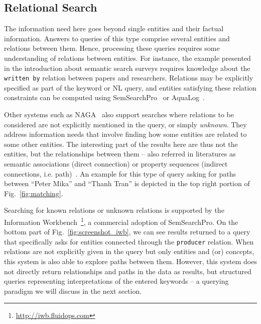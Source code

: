 \subsection{Relational Search} The information need here goes beyond single entities and their factual information. Answers to queries of this type comprise several entities and relations between them. Hence, processing these queries requires some understanding of relations between entities. For instance, the example presented in the introduction about semantic search surveys requires knowledge about the \verb+written by+ relation between papers and researchers. Relations may be explicitly specified as part of the keyword or NL query, and entities satisfying these relation constraints can be computed using SemSearchPro~\cite{DBLP:journals/ws/TranHL11} or AquaLog~\cite{DBLP:journals/ws/LopezUMP07}. 

Other systems such as NAGA~\cite{DBLP:conf/icde/KasneciSIRW08} also support searches where relations to be considered are not explicitly mentioned in the query, or simply \emph{unknown}. They address information needs that involve finding how some entities are related to some other entities. The interesting part of the results here are thus not the entities, but the relationships between them -- also referred in literatures as semantic associations (direct connection) or property sequences (indirect connections, i.e. path)~\cite{DBLP:conf/www/AnyanwuS03}. An example for this type of query asking for paths between ``Peter Mika'' and ``Thanh Tran'' is depicted in the top right portion of Fig.~\ref{fig:matching}.

Searching for known relations or unknown relations is supported by the Information Workbench~\footnote{\url{http://iwb.fluidops.com}}, a commercial adoption of SemSearchPro. On the bottom part of Fig.~\ref{fig:screenshot_iwb}, we can see results returned to a query that specifically asks for entities connected through the \verb+producer+ relation. When relations are not explicitly given in the query but only entities and (or) concepts, this system is also able to explore paths between them. However, this system does not directly return relationships and paths in the data as results, but structured queries representing interpretations of the entered keywords -- a querying paradigm we will discuss in the next section. 


